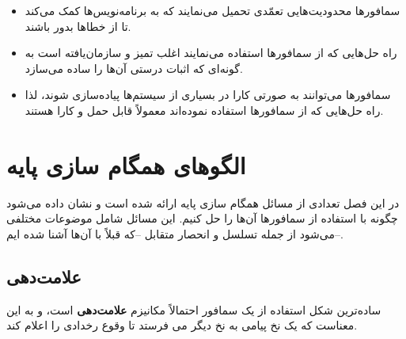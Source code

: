 \documentclass{book}
\newcommand{\clearemptydoublepage}{\newpage\cleardoublepage}
\begin{document}
\begin{itemize}

\item 
    سمافورها محدودیت‌هایی تعمّدی تحمیل می‌نمایند که به برنامه‌نویس‌ها کمک می‌کند تا از خطاها بدور باشند. 

\item 
    راه حل‌هایی که از سمافورها استفاده می‌نمایند اغلب تمیز و سازمان‌یافته است به گونه‌ای که اثبات درستی آن‌ها را ساده می‌سازد. 

\item 
    سمافورها می‌توانند به صورتی کارا در بسیاری از سیستم‌ها پیاده‌سازی شوند، لذا راه حل‌هایی که از سمافورها استفاده نموده‌اند معمولاً قابل حمل 
    و کارا هستند. 
\end{itemize}

\clearemptydoublepage

\chapter{الگوهای همگام سازی پایه}

در این فصل تعدادی از مسائل همگام سازی پایه ارائه شده است و نشان داده می‌شود چگونه با استفاده از سمافورها آن‌ها را حل کنیم. این مسائل شامل موضوعات مختلفی می‌شود از جمله تسلسل و انحصار متقابل --که قبلاً با آن‌ها آشنا شده ایم--.

\section{علامت‌دهی}

ساده‌ترین شکل استفاده از یک سمافور احتمالاً مکانیزم \textbf{علامت‌دهی}  است، 
و به این معناست که یک نخ%
پیامی به نخ دیگر می فرستد تا وقوع رخدادی را اعلام کند.
\end{document}
